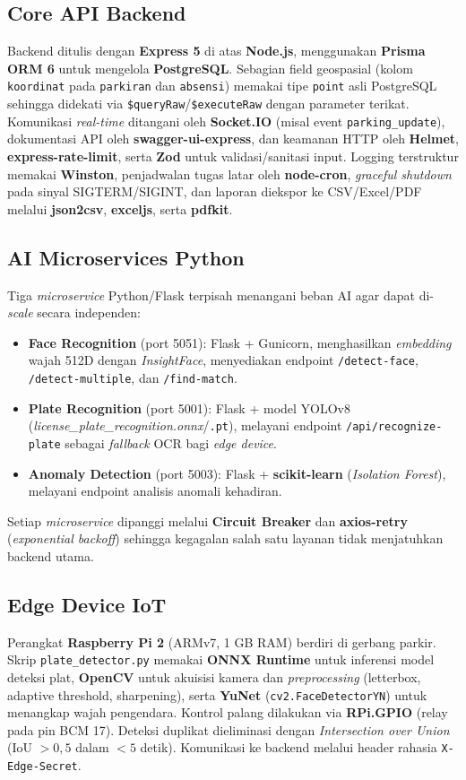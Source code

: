 \documentclass[12pt,titlepage,a4paper]{report}
\begin{document}
\subsection{Core API Backend}
Backend ditulis dengan \textbf{Express 5} di atas \textbf{Node.js}, menggunakan \textbf{Prisma ORM 6} untuk mengelola \textbf{PostgreSQL}. Sebagian field geospasial (kolom \texttt{koordinat} pada \texttt{parkiran} dan \texttt{absensi}) memakai tipe \texttt{point} asli PostgreSQL sehingga didekati via \texttt{\$queryRaw}/\texttt{\$executeRaw} dengan parameter terikat. Komunikasi \textit{real-time} ditangani oleh \textbf{Socket.IO} (misal event \texttt{parking\_update}), dokumentasi API oleh \textbf{swagger-ui-express}, dan keamanan HTTP oleh \textbf{Helmet}, \textbf{express-rate-limit}, serta \textbf{Zod} untuk validasi/sanitasi input. Logging terstruktur memakai \textbf{Winston}, penjadwalan tugas latar oleh \textbf{node-cron}, \textit{graceful shutdown} pada sinyal SIGTERM/SIGINT, dan laporan diekspor ke CSV/Excel/PDF melalui \textbf{json2csv}, \textbf{exceljs}, serta \textbf{pdfkit}.

\subsection{AI Microservices Python}
Tiga \textit{microservice} Python/Flask terpisah menangani beban AI agar dapat di-\textit{scale} secara independen:
\begin{itemize}
    \item \textbf{Face Recognition} (port 5051): Flask + Gunicorn, menghasilkan \textit{embedding} wajah 512D dengan \textit{InsightFace}, menyediakan endpoint \texttt{/detect-face}, \texttt{/detect-multiple}, dan \texttt{/find-match}.
    \item \textbf{Plate Recognition} (port 5001): Flask + model YOLOv8 (\textit{license\_plate\_recognition.onnx}/\texttt{.pt}), melayani endpoint \texttt{/api/recognize-plate} sebagai \textit{fallback} OCR bagi \textit{edge device}.
    \item \textbf{Anomaly Detection} (port 5003): Flask + \textbf{scikit-learn} (\textit{Isolation Forest}), melayani endpoint analisis anomali kehadiran.
\end{itemize}
Setiap \textit{microservice} dipanggi melalui \textbf{Circuit Breaker} dan \textbf{axios-retry} (\textit{exponential backoff}) sehingga kegagalan salah satu layanan tidak menjatuhkan backend utama.

\subsection{Edge Device IoT}
Perangkat \textbf{Raspberry Pi 2} (ARMv7, 1 GB RAM) berdiri di gerbang parkir. Skrip \texttt{plate\_detector.py} memakai \textbf{ONNX Runtime} untuk inferensi model deteksi plat, \textbf{OpenCV} untuk akuisisi kamera dan \textit{preprocessing} (letterbox, adaptive threshold, sharpening), serta \textbf{YuNet} (\texttt{cv2.FaceDetectorYN}) untuk menangkap wajah pengendara. Kontrol palang dilakukan via \textbf{RPi.GPIO} (relay pada pin BCM 17). Deteksi duplikat dieliminasi dengan \textit{Intersection over Union} (IoU $> 0{,}5$ dalam $<5$ detik). Komunikasi ke backend melalui header rahasia \texttt{X-Edge-Secret}.
\end{document}

